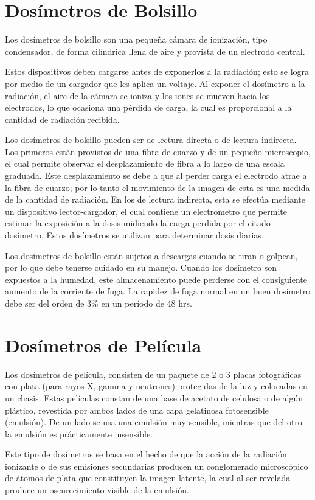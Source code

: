 \section*{Dosímetros de Bolsillo}

Los dosímetros de bolsillo son una pequeña cámara de ionización, tipo condensador, de forma cilíndrica llena de aire y provista de un electrodo central.

Estos dispositivos deben cargarse antes de exponerlos a la radiación; esto se logra por medio de un cargador que les aplica un voltaje. Al exponer el dosímetro a la radiación, el aire de la cámara se ioniza y los iones se mueven hacia los electrodos, lo que ocasiona una pérdida de carga, la cual es proporcional a la cantidad de radiación recibida.

Los dosímetros de bolsillo pueden ser de lectura directa o de lectura indirecta. Los primeros están provistos de una fibra de cuarzo y de un pequeño microscopio, el cual permite observar el desplazamiento de fibra a lo largo de una escala graduada. Este desplazamiento se debe a que al perder carga el electrodo atrae a la fibra de cuarzo; por lo tanto el movimiento de la imagen de esta es una medida de la cantidad de radiación. En los de lectura indirecta, esta se efectúa mediante un dispositivo lector-cargador, el cual contiene un electrometro que permite estimar la exposición a la dosis midiendo la carga perdida por el citado dosímetro. Estos dosímetros se utilizan para determinar dosis diarias.

Los dosímetros de bolsillo están sujetos a descargas cuando se tiran o golpean, por lo que debe tenerse cuidado en su manejo. Cuando los dosímetro son expuestos a la humedad, este almacenamiento puede perderse con el consiguiente aumento de la corriente de fuga. La rapidez de fuga normal en un buen dosímetro debe ser del orden de 3\% en un período de 48 hrs.

\section*{Dosímetros de Película}

Los dosímetros de película, consisten de un paquete de 2 o 3 placas fotográficas con plata (para rayos X, gamma y neutrones) protegidas de la luz y colocadas en un chasis. Estas películas constan de una base de acetato de celulosa o de algún plástico, revestida por ambos lados de una capa gelatinosa fotosensible (emulsión). De un lado se usa una emulsión muy sensible, mientras que del otro la emulsión es prácticamente insensible.

Este tipo de dosímetros se basa en el hecho de que la acción de la radiación ionizante o de sus emisiones secundarias producen un conglomerado microscópico de átomos de plata que constituyen la imagen latente, la cual al ser revelada produce un oscurecimiento visible de la emulsión.
